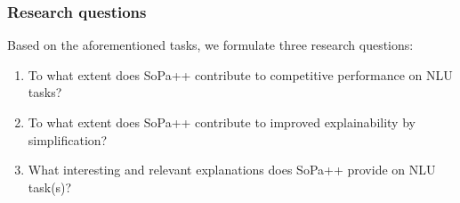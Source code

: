\subsubsection{Research questions}

Based on the aforementioned tasks, we formulate three research questions:

\begin{enumerate}
  \item To what extent does SoPa++ contribute to competitive performance on NLU
  tasks?
  \item To what extent does SoPa++ contribute to improved explainability by
  simplification?
  \item What interesting and relevant explanations does SoPa++ provide on NLU
  task(s)?
\end{enumerate}


